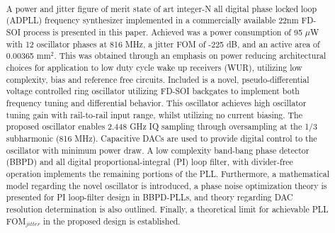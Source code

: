 

\pagestyle{fancy}
\fancyhf{}
\fancyhead[LE,RO]{\fontfamily{\sfdefault}\selectfont \textbf{\rightmark}}
\title{\textbf{}}
\date{}

\sloppy\RaggedRight\raggedbottom
	
	
	\pagebreak

	\justify
	\setcounter{page}{1}
	\thispagestyle{nohdr}
	\large\fontfamily{\sfdefault}\selectfont \		
	\begin{abstract} \large\fontfamily{\rmdefault}\selectfont \
		
		\vspace{-2em}A power and jitter figure of merit state of art integer-N all digital phase locked loop (ADPLL) frequency synthesizer implemented in a commercially available 22nm FD-SOI process is presented in this paper. Achieved was a power consumption of 95 $\mu$W with 12 oscillator phases at 816 MHz, a jitter FOM of -225 dB, and an active area of 0.00365 mm$^2$. This was obtained through an emphasis on power reducing architectural choices for application to low duty cycle wake up receivers (WUR), utilizing low complexity, bias and reference free circuits. Included is a novel, pseudo-differential voltage controlled ring oscillator utilizing FD-SOI backgates to implement both frequency tuning and differential behavior. This oscillator achieves high oscillator tuning gain with rail-to-rail input range, whilst utilizing no current biasing. The proposed oscillator enables 2.448 GHz IQ sampling through oversampling at the 1/3 subharmonic (816 MHz). Capacitive DACs are used to provide digital control to the oscillator with minimum power draw. A low complexity band-bang phase detector (BBPD) and all digital proportional-integral (PI) loop filter, with divider-free operation implements the remaining portions of the PLL. Furthermore, a mathematical model regarding the novel oscillator is introduced, a phase noise optimization theory is presented for PI loop-filter design in BBPD-PLLs, and theory regarding DAC resolution determination is also outlined. Finally, a theoretical limit for achievable PLL FOM$_{jitter}$ in the proposed design is established.
	\end{abstract}

